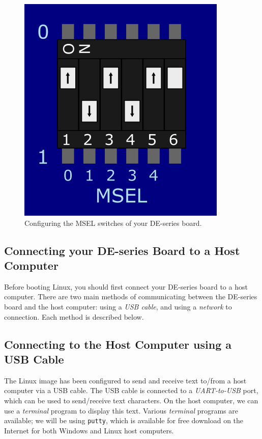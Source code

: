 \documentclass[11pt, twoside, pdftex]{article}
\begin{document}
\begin{figure} [H]
\begin{center}
\includegraphics[scale = 1.00]{figures/MSEL.png}
\end{center}
\caption{Configuring the MSEL switches of your DE-series board.}
\label{fig:msel}
\end{figure}

\subsection{Connecting your DE-series Board to a Host Computer}

Before booting Linux, you should first connect your DE-series board to a host computer.
There are two main methods of communicating between the DE-series board and the host
computer: using a {\it USB cable}, and using a {\it network} to connection. Each method is 
described below.

\subsection{Connecting to the Host Computer using a USB Cable}
\label{sec:conn_USB}

The Linux image has been configured to send and receive text to/from a host computer via a 
USB cable. The USB cable is connected to a {\it UART-to-USB} port, which can be used to 
send/receive text characters. On the host computer, we can use a \textit{terminal} program 
to display this text. Various \textit{terminal} programs are available; we will be using
\texttt{putty}, which is available for free download on the Internet for both Windows and 
Linux host computers. 
\end{document}
